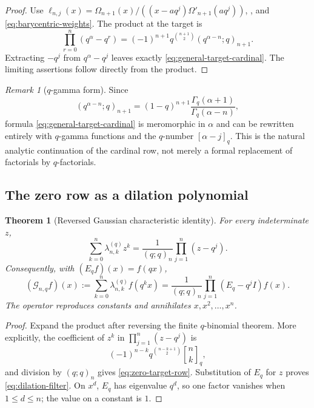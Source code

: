 \documentclass[11pt,a4paper,oneside]{article}
\newtheorem{theorem}{Theorem}[section]
\theoremstyle{definition}
\theoremstyle{remark}
\newtheorem{remark}[remark]{Remark}
\newcommand{\Gop}{\mathcal G}
\newcommand{\qbinom}[3]{\genfrac{[}{]}{0pt}{}{#1}{#2}_{#3}}
\begin{document}
\begin{proof}
Use
$\ell_{n,j}(x)=\Omega_{n+1}(x)/((x-aq^j)\Omega'_{n+1}(aq^j))$,
, and \eqref{eq:barycentric-weights}.  The product
at the target is
\[
 \prod_{r=0}^n(q^\alpha-q^r)
 =(-1)^{n+1}q^{\binom{n+1}{2}}(q^{\alpha-n};q)_{n+1}.
\]
Extracting $-q^j$ from $q^\alpha-q^j$ leaves exactly
\eqref{eq:general-target-cardinal}.  The limiting assertions follow directly
from the product.
\end{proof}

\begin{remark}[$q$-gamma form]
Since
\[
 (q^{\alpha-n};q)_{n+1}
 =(1-q)^{n+1}\frac{\Gamma_q(\alpha+1)}{\Gamma_q(\alpha-n)},
\]
formula \eqref{eq:general-target-cardinal} is meromorphic in $\alpha$ and can
be rewritten entirely with $q$-gamma functions and the $q$-number
$[\alpha-j]_q$.  This is the natural analytic continuation of the cardinal
row, not merely a formal replacement of factorials by $q$-factorials.
\end{remark}

\subsection{The zero row as a dilation polynomial}

\begin{theorem}[Reversed Gaussian characteristic identity]
\label{thm:filter-characteristic}
For every indeterminate $z$,
\begin{equation}
 \sum_{k=0}^n\lambda_{n,k}^{(q)}z^k
 =\frac1{(q;q)_n}\prod_{j=1}^n(z-q^j).
 \label{eq:lambda-characteristic}
\end{equation}
Consequently, with $(E_qf)(x)=f(qx)$,
\begin{equation}
 (\Gop_{n,q}f)(x)
 :=\sum_{k=0}^n\lambda_{n,k}^{(q)}f(q^kx)
 =\frac1{(q;q)_n}\prod_{j=1}^n(E_q-q^jI)f(x).
 \label{eq:dilation-filter}
\end{equation}
The operator reproduces constants and annihilates $x,x^2,\ldots,x^n$.
\end{theorem}

\begin{proof}
Expand the product after reversing the finite $q$-binomial theorem.  More
explicitly, the coefficient of $z^k$ in
$\prod_{j=1}^n(z-q^j)$ is
\[
 (-1)^{n-k}q^{\binom{n-k+1}{2}}\qbinom nkq,
\]
and division by $(q;q)_n$ gives \eqref{eq:zero-target-row}.  Substitution of
$E_q$ for $z$ proves \eqref{eq:dilation-filter}.  On $x^d$, $E_q$ has
eigenvalue $q^d$, so one factor vanishes when $1\le d\le n$; the value on a
constant is $1$.
\end{proof}
\end{document}
